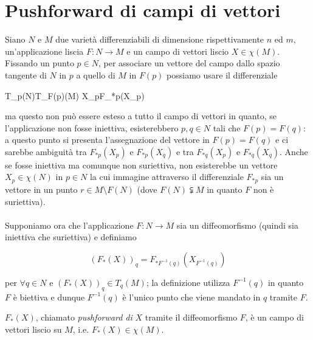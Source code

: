 \section{Pushforward di campi di vettori}

Siano $ N $ e $ M $ due varietà differenziabili di dimensione rispettivamente $ n $ ed $ m $, un'applicazione liscia $ F : N \to M $ e un campo di vettori liscio $ X \in \chi(M) $. Fissando un punto $ p \in N $, per associare un vettore del campo dallo spazio tangente di $ N $ in $ p $ a quello di $ M $ in $ F(p) $ possiamo usare il differenziale

	{T_{p}(N)}{T_{F(p)}(M)}
	{X_{p}}{F_{*p}(X_{p})}

ma questo non può essere esteso a tutto il campo di vettori in quanto, se l'applicazione non fosse iniettiva, esisterebbero $ p,q \in N $ tali che $ F(p) = F(q) $: a questo punto si presenta l'assegnazione del vettore in $ F(p) = F(q) $ e ci sarebbe ambiguità tra $ F_{*p}(X_{p}) $ e $ F_{*p}(X_{q}) $ e tra $ F_{*q}(X_{p}) $ e $ F_{*q}(X_{q}) $. Anche se fosse iniettiva ma comunque non suriettiva, non esisterebbe un vettore $ X_{p} \in \chi(N) $ in $ p \in N $ la cui immagine attraverso il differenziale $ F_{*p} $ sia un vettore in un punto $ r \in M \setminus F(N) $ (dove $ F(N) \subsetneqq M $ in quanto $ F $ non è suriettiva).\\\\
%
Supponiamo ora che l'applicazione $ F : N \to M $ sia un diffeomorfismo (quindi sia iniettiva che suriettiva) e definiamo

\begin{equation}
	(F_{*} (X))_{q} = F_{*F^{-1}(q)} (X_{F^{-1}(q)})
\end{equation}

per $ \forall q \in N $ e $ (F_{*} (X))_{q} \in T_{q}(M) $; la definizione utilizza $ F^{-1}(q) $ in quanto $ F $ è biettiva e dunque $ F^{-1}(q) $ è l'unico punto che viene mandato in $ q $ tramite $ F $.

\begin{definition}
	$ F_{*}(X) $, chiamato \textit{pushforward di} $ X $ tramite il diffeomorfismo $ F $, è un campo di vettori liscio su $ M $, i.e. $ F_{*}(X) \in \chi(M) $.
\end{definition}


